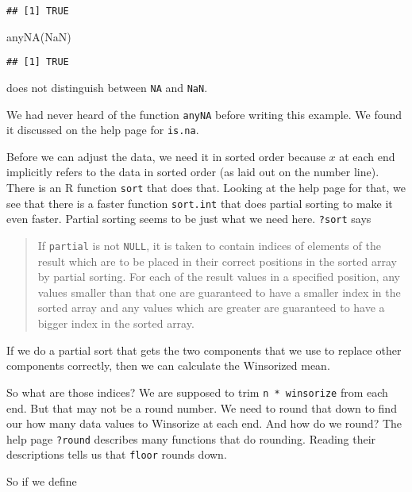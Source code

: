\documentclass[
]{article}
\newenvironment{Shaded}{\begin{snugshade}}{\end{snugshade}}
\newcommand{\ConstantTok}[1]{\textcolor[rgb]{0.00,0.00,0.00}{#1}}
\newcommand{\FunctionTok}[1]{\textcolor[rgb]{0.00,0.00,0.00}{#1}}
\newcommand{\NormalTok}[1]{#1}
\begin{document}
\begin{verbatim}
## [1] TRUE
\end{verbatim}

\begin{Shaded}
\begin{Highlighting}[]
\FunctionTok{anyNA}\NormalTok{(}\ConstantTok{NaN}\NormalTok{)}
\end{Highlighting}
\end{Shaded}

\begin{verbatim}
## [1] TRUE
\end{verbatim}

does not distinguish between \texttt{NA} and \texttt{NaN}.

We had never heard of the function \texttt{anyNA} before writing this
example. We found it discussed on the help page for \texttt{is.na}.

Before we can adjust the data, we need it in sorted order because \(x\)
at each end implicitly refers to the data in sorted order (as laid out
on the number line). There is an R function \texttt{sort} that does
that. Looking at the help page for that, we see that there is a faster
function \texttt{sort.int} that does partial sorting to make it even
faster. Partial sorting seems to be just what we need here.
\texttt{?sort} says

\begin{quote}
If \texttt{partial} is not \texttt{NULL}, it is taken to contain indices
of elements of the result which are to be placed in their correct
positions in the sorted array by partial sorting. For each of the result
values in a specified position, any values smaller than that one are
guaranteed to have a smaller index in the sorted array and any values
which are greater are guaranteed to have a bigger index in the sorted
array.
\end{quote}

If we do a partial sort that gets the two components that we use to
replace other components correctly, then we can calculate the Winsorized
mean.

So what are those indices? We are supposed to trim
\texttt{n\ *\ winsorize} from each end. But that may not be a round
number. We need to round that down to find our how many data values to
Winsorize at each end. And how do we round? The help page
\texttt{?round} describes many functions that do rounding. Reading their
descriptions tells us that \texttt{floor} rounds down.

So if we define
\end{document}
